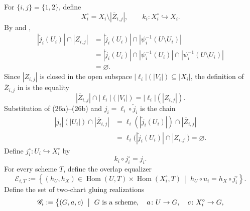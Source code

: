 \begin{definition}
  \label{def:nagata-two-open-intermediate-schemes}

  For $\{i,j\}=\{1,2\}$, define
  \[
    X_i^\circ=X_i\setminus|\overline Z_{i,j}|,\qquad
    k_i\colon X_i^\circ\hookrightarrow X_i.
  \]
  By  and
  ,
  \[
  \begin{aligned}
    |\widetilde j_i(U_i)|\cap|Z_{i,j}|
      &=|\widetilde j_i(U_i)|
          \cap|\psi_i^{-1}(U\setminus U_i)|\\
      &=|\widetilde j_i(U_i)|
          \cap|\psi_i^{-1}(U_i)|
          \cap|\psi_i^{-1}(U\setminus U_i)|\\
      &=\varnothing.
  \end{aligned}                                                   \tag{26a}
  \]
  Since $|Z_{i,j}|$ is closed in the open subspace
  $|\ell_i|(|V_i|)\subseteq|X_i|$, the definition of
  $\overline Z_{i,j}$ in
   is the equality
  \[
    |\overline Z_{i,j}|\cap|\ell_i|(|V_i|)
      =|\ell_i|(|Z_{i,j}|).                                      \tag{26b}
  \]
  Substitution of (26a)--(26b) and
  $j_i=\ell_i\circ\widetilde j_i$ is the chain
  \[
  \begin{aligned}
    |j_i|(|U_i|)\cap|\overline Z_{i,j}|
      &=\ell_i(|\widetilde j_i(U_i)|)
          \cap|\overline Z_{i,j}|\\
      &=\ell_i\bigl(
          |\widetilde j_i(U_i)|\cap|Z_{i,j}|
        \bigr)
       =\varnothing.
  \end{aligned}                                                   \tag{26c}
  \]
  Define $j_i^\circ\colon U_i\hookrightarrow X_i^\circ$ by
  \[
    k_i\circ j_i^\circ=j_i.
  \]
  For every scheme $T$, define the overlap equalizer
  \[
    \mathscr E_{i,T}:=
      \left\{(h_U,h_X)\in
        \operatorname{Hom}(U,T)\times\operatorname{Hom}(X_i^\circ,T)
        \ \middle|\ 
        h_U\circ u_i=h_X\circ j_i^\circ
      \right\}.                                                    \tag{26d}
  \]
  Define the set of two-chart gluing realizations
  \[
  \begin{aligned}
    \mathscr G_i:=\bigl\{(G,a,c)\ \bigm|\ {}&
      G\text{ is a scheme},\quad
      a\colon U\to G,\quad c\colon X_i^\circ\to G,\\

\end{aligned}\]
\end{definition}
